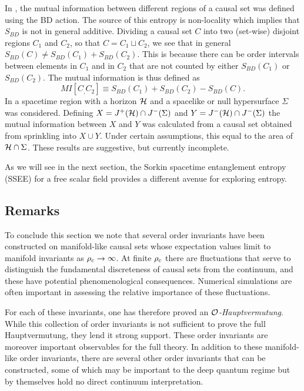 In \cite{dionthesis},  the  mutual information between  different regions of a causal set was defined  using the
BD action. The source of this entropy is non-locality which implies that $S_{BD}$ is not in general additive.  Dividing
a causal set $C$ into two (set-wise) disjoint regions $C_1$ and $C_2$, so that $C=C_1 \sqcup C_2$,  we see that in
general $S_{BD}(C) \neq S_{BD}(C_1) + S_{BD}(C_2)$.  This is because 
there can be order intervals between elements in $C_1$
and in $C_2$ that are not counted by either $S_{BD}(C_1)$ or $S_{BD}(C_2)$. The  mutual information is thus 
defined as
\begin{equation}
  MI[C_,C_2]\equiv S_{BD}(C_1) +S_{BD}(C_2)-S_{BD}(C). 
\end{equation}
In  \citep{dionthesis}  a spacetime region with a horizon $\mathcal H$ and a  spacelike or
null hypersurface $\Sigma$ was considered. Defining $X=J^+(\mathcal H) \cap J^-(\Sigma)$ and $Y=J^-(\mathcal H) \cap J^-(\Sigma)$ the mutual
information between $X$ and $Y$ was calculated from  a causal set obtained from sprinkling  into $X\cup Y$.  Under
certain assumptions, this equal to the area of $\mathcal H\cap \Sigma$. These results are suggestive, but currently incomplete.

As we will see in the next section, the {Sorkin spacetime  entanglement entropy (SSEE)} for a free scalar field provides a
different avenue for exploring entropy.


\subsection{Remarks} 

To conclude this section  we note that several order invariants have been constructed on manifold-like causal sets  whose expectation
values limit to manifold  invariants  as $\rho_c \rightarrow \infty$. At finite $\rho_c$ there are  
fluctuations that serve to distinguish the fundamental discreteness of causal sets from the continuum, and these have potential
phenomenological consequences.  Numerical simulations are often important in 
assessing the relative importance of these fluctuations. 

For each of these invariants, one has therefore proved an  \emph{$\mathcal O$-Hauptvermutung}.  While this collection of
order invariants is not sufficient to prove   the full Hauptvermutung, they lend it strong support. These order
invariants are moreover important observables for the full theory.   In addition to these
manifold-like order invariants, there are several other order invariants that can be constructed, 
some of which may be important to the deep quantum regime but by themselves hold no direct continuum interpretation.



